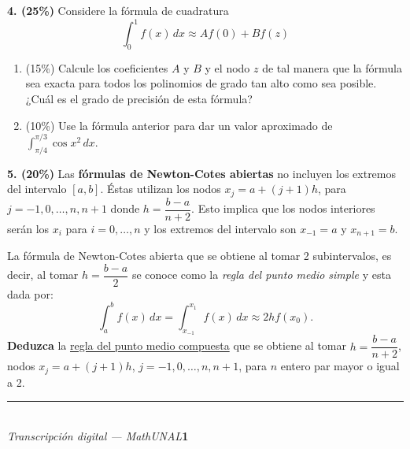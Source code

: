 \documentclass[11pt]{article}
\begin{document}
\vspace{5mm}
\noindent\textbf{4. (25\%)} Considere la fórmula de cuadratura
\[
\int_0^1 f(x)\,dx\approx Af(0)+Bf(z)
\]
\begin{enumerate}
\item[i.] (15\%) Calcule los coeficientes $A$ y $B$ y el nodo $z$ de tal manera que la fórmula sea exacta para todos los polinomios de grado tan alto como sea posible. ¿Cuál es el grado de precisión de esta fórmula?
\item[ii.] (10\%) Use la fórmula anterior para dar un valor aproximado de $\displaystyle\int_{\pi/4}^{\pi/3}\cos x^2\,dx$.
\end{enumerate}

\vspace{5mm}
\noindent\textbf{5. (20\%)} Las \textbf{fórmulas de Newton-Cotes abiertas} no incluyen los extremos del intervalo $[a,b]$. Éstas utilizan los nodos $x_j=a+(j+1)h$, para $j=-1,0,\ldots,n,n+1$ donde $h=\dfrac{b-a}{n+2}$. Esto implica que los nodos interiores serán los $x_i$ para $i=0,\ldots,n$ y los extremos del intervalo son $x_{-1}=a$ y $x_{n+1}=b$.

La fórmula de Newton-Cotes abierta que se obtiene al tomar 2 subintervalos, es decir, al tomar $h=\dfrac{b-a}2$ se conoce como la \textit{regla del punto medio simple} y esta dada por:
\[
\int_a^b f(x)\,dx=\int_{x_{-1}}^{x_1} f(x)\,dx\approx 2hf(x_0).
\]
\textbf{Deduzca} la \underline{regla del punto medio compuesta} que se obtiene al tomar $h=\dfrac{b-a}{n+2}$, nodos $x_j=a+(j+1)h$, $j=-1,0,\ldots,n,n+1$, para $n$ entero par mayor o igual a 2.

\vfill
\rule{\linewidth}{0.4pt}\\[1pt]
{\scriptsize\textit{Transcripción digital --- MathUNAL}\hfill\textcolor{unalblue}{\textbf{1}}}
\end{document}
